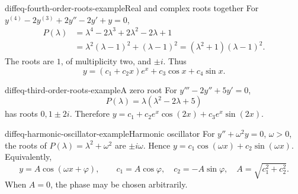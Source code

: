 \documentclass[preview]{standalone}
\begin{document}
\begin{snippetexample}{diffeq-fourth-order-roots-example}{Real and complex roots together}
    For \(y^{(4)}-2y^{(3)}+2y''-2y'+y=0\),
    \begin{align*}
        P(\lambda)&=\lambda^4-2\lambda^3+2\lambda^2-2\lambda+1\\
        &=\lambda^2(\lambda-1)^2+(\lambda-1)^2
        =(\lambda^2+1)(\lambda-1)^2.
    \end{align*}
    The roots are \(1\), of multiplicity two, and \(\pm i\). Thus
    \[
        y=(c_1+c_2x)e^x+c_3\cos x+c_4\sin x.
    \]
\end{snippetexample}

\begin{snippetexample}{diffeq-third-order-roots-example}{A zero root}
    For \(y'''-2y''+5y'=0\),
    \[
        P(\lambda)=\lambda(\lambda^2-2\lambda+5)
    \]
    has roots \(0,1\pm2i\). Therefore
    \(y=c_1+c_2e^x\cos(2x)+c_3e^x\sin(2x)\).
\end{snippetexample}

\begin{snippetexample}{diffeq-harmonic-oscillator-example}{Harmonic oscillator}
    For \(y''+\omega^2y=0\), \(\omega>0\), the roots of
    \(P(\lambda)=\lambda^2+\omega^2\) are \(\pm i\omega\).
    Hence \(y=c_1\cos(\omega x)+c_2\sin(\omega x)\).
    Equivalently,
    \[
        y=A\cos(\omega x+\varphi),\qquad
        c_1=A\cos\varphi,\quad c_2=-A\sin\varphi,\quad
        A=\sqrt{c_1^2+c_2^2}.
    \]
    When \(A=0\), the phase may be chosen arbitrarily.
\end{snippetexample}
\end{document}
